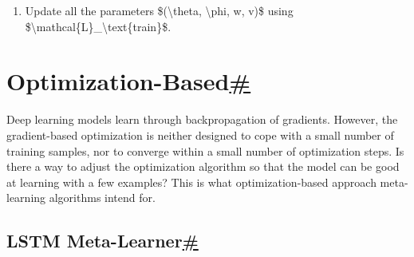 \begin{enumerate}
  \$\$ \textbackslash begin\{aligned\} a\_j \&= \textbackslash text\{cosine\}(\textbackslash mathbf\{R\}, r\_j) = {[}\textbackslash frac\{r\textquotesingle\_1\textbackslash cdot r\_j\}\{\textbackslash\textbar r\textquotesingle\_1\textbackslash\textbar\textbackslash cdot\textbackslash\textbar r\_j\textbackslash\textbar\}, \textbackslash dots, \textbackslash frac\{r\textquotesingle\_N\textbackslash cdot r\_j\}\{\textbackslash\textbar r\textquotesingle\_N\textbackslash\textbar\textbackslash cdot\textbackslash\textbar r\_j\textbackslash\textbar\}{]}\textbackslash\textbackslash{} \textbackslash phi\^{}+\_j \&= \textbackslash text\{softmax\}(a\_j)\^{}\textbackslash top \textbackslash mathbf\{M\} \textbackslash end\{aligned\} \$\$

  \begin{itemize}
  \tightlist
  \item
    c. Update the training loss: \$\textbackslash mathcal\{L\}\_\textbackslash text\{train\} \textbackslash leftarrow \textbackslash mathcal\{L\}\_\textbackslash text\{train\} + \textbackslash mathcal\{L\}\^{}\textbackslash text\{task\}(g\_\{\textbackslash phi, \textbackslash phi\^{}+\}(\textbackslash mathbf\{x\}\_i), y\_i) \$
  \end{itemize}
\item
  Update all the parameters \$(\textbackslash theta, \textbackslash phi, w, v)\$ using \$\textbackslash mathcal\{L\}\_\textbackslash text\{train\}\$.
\end{enumerate}

\section{\texorpdfstring{Optimization-Based\hyperref[optimization-based]{\#}}{Optimization-Based\#}}\label{optimization-based}

Deep learning models learn through backpropagation of gradients. However, the gradient-based optimization is neither designed to cope with a small number of training samples, nor to converge within a small number of optimization steps. Is there a way to adjust the optimization algorithm so that the model can be good at learning with a few examples? This is what optimization-based approach meta-learning algorithms intend for.

\subsection{\texorpdfstring{LSTM Meta-Learner\hyperref[lstm-meta-learner]{\#}}{LSTM Meta-Learner\#}}\label{lstm-meta-learner}

